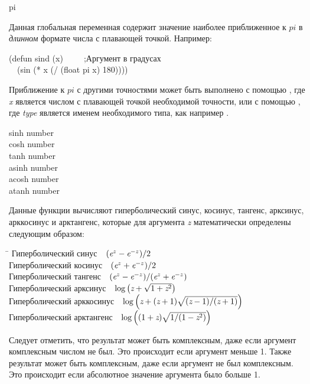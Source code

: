 \begin{defun}[Константа]
pi

Данная глобальная переменная содержит значение наиболее приближенное к $pi$ в
\emph{длинном} формате числа с плавающей точкой.
Например:
\begin{lisp}
(defun sind (x)~~~~~;\textrm{Аргумент в градусах} \\
~~(sin (* x (/ (float pi x) 180))))
\end{lisp}
Приближение к $pi$ с другими точностями может быть выполнено с помощью
, где \emph{x} является числом с плавающей точкой
необходимой точности, или с помощью  , где
\emph{type} является именем необходимого типа, как например .
\end{defun}

\relax

\begin{defun}[Функция]
sinh number \\
cosh number \\
tanh number \\
asinh number \\
acosh number \\
atanh number

Данные функции вычисляют гиперболический синус, косинус, тангенс, арксинус,
арккосинус и арктангенс, которые для аргумента \emph{z} математически определены
следующим образом:
\begin{tabbing}
\hskip 10pc\=\kill
Гиперболический синус~~\>$ (\emph{e}^{z}-\emph{e}^{-z})/2 $ \\
Гиперболический косинус~~\>$ (\emph{e}^{z}+\emph{e}^{-z})/2 $ \\
Гиперболический тангенс~~\>$ (\emph{e}^{z}-\emph{e}^{-z})/(\emph{e}^{z}+\emph{e}^{-z}) $ \\[2pt]
Гиперболический арксинус~~\>$ \log\left(\emph{z}+\sqrt{1+\emph{z}^2}\right) $ \\[2pt]
Гиперболический арккосинус~~\>$ \log\left(\emph{z}+(\emph{z}+1)\sqrt{(\emph{z}-1)/(\emph{z}+1)}\right) $ \\[2pt]
Гиперболический арктангенс~~\>$ \log\left((1+\emph{z})\sqrt{1/(1-\emph{z}^2)}\right) $
\end{tabbing}

Следует отметить, что результат  может быть комплексным, даже если
аргумент комплексным числом не был. Это происходит если аргумент меньше 1.
Также результат  может быть комплексным, даже если аргумент не был
комплексным. Это происходит если абсолютное значение аргумента было больше 1.
\end{defun}

